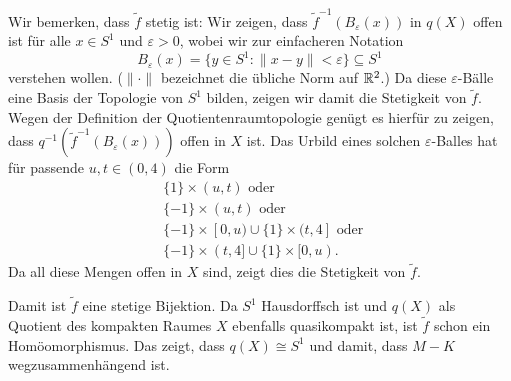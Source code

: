 \documentclass[a4paper,10pt]{article}
\begin{document}
\begin{center}
\end{center}

Wir bemerken, dass $\tilde{f}$ stetig ist: Wir zeigen, dass $\tilde{f}^{-1}(B_\varepsilon(x))$ in $q(X)$ offen ist für alle $x \in S^1$ und $\varepsilon > 0$, wobei wir zur einfacheren Notation
\[
 B_\varepsilon(x) = \{y \in S^1 : \|x-y\| < \varepsilon\} \subseteq S^1
\]
verstehen wollen. ($\|\cdot\|$ bezeichnet die übliche Norm auf $\mathbb{R}^2$.) Da diese $\varepsilon$-Bälle eine Basis der Topologie von $S^1$ bilden, zeigen wir damit die Stetigkeit von $\tilde{f}$. Wegen der Definition der Quotientenraumtopologie genügt es hierfür zu zeigen, dass $q^{-1}(\tilde{f}^{-1}(B_\varepsilon(x)))$ offen in $X$ ist. Das Urbild eines solchen $\varepsilon$-Balles hat für passende $u, t \in (0,4)$ die Form
\begin{align*}
 &\{1\} \times (u,t) \text{ oder } \\
 &\{-1\} \times (u,t) \text{ oder } \\
 &\{-1\} \times [0,u) \cup \{1\} \times (t,4] \text{ oder } \\
 &\{-1\} \times (t,4] \cup \{1\} \times [0,u).
\end{align*}
Da all diese Mengen offen in $X$ sind, zeigt dies die Stetigkeit von $\tilde{f}$.

Damit ist $\tilde{f}$ eine stetige Bijektion. Da $S^1$ Hausdorffsch ist und $q(X)$ als Quotient des kompakten Raumes $X$ ebenfalls quasikompakt ist, ist $\tilde{f}$ schon ein Homöomorphismus. Das zeigt, dass $q(X) \cong S^1$ und damit, dass $M-K$ wegzusammenhängend ist.
\end{document}
